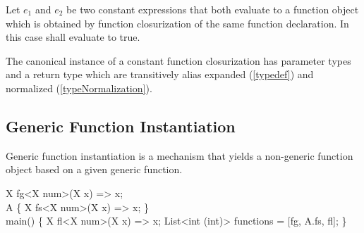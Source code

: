 \documentclass[makeidx]{article}
\begin{document}
{\LMHash{}%
Let $e_1$ and $e_2$ be two constant expressions that both
evaluate to a function object which is obtained by function closurization
of the same function declaration.
In this case  shall evaluate to true.


\LMHash{}%
The canonical instance of a constant function closurization has
parameter types and a return type
which are transitively alias expanded
(\ref{typedef})
and normalized
(\ref{typeNormalization}).


\subsection{Generic Function Instantiation}


\LMHash{}%
Generic function instantiation is a mechanism that yields
a non-generic function object based on a given generic function.


\begin{dartCode}
X fg<X \EXTENDS{} num>(X x) => x;
\\
\CLASS{} A \{
  \STATIC{} X fs<X \EXTENDS{} num>(X x) => x;
\}
\\
\VOID{} main() \{
  X fl<X \EXTENDS{} num>(X x) => x;
  List<int \FUNCTION{}(int)> functions = [fg, A.fs, fl];
\}
\end{dartCode}

}
\end{document}
